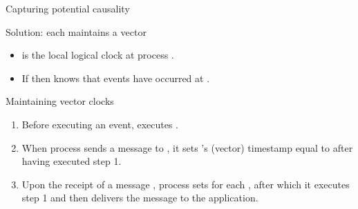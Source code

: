 \begin{slide}{Capturing potential causality}
  \begin{block}{Solution: each  maintains a vector }
    \begin{itemize}
    \item {} is the local logical clock at process .
    \item If  then  knows that  events have occurred at
      .
    \end{itemize}
  \end{block}
  \begin{block}{Maintaining vector clocks}
    \begin{enumerate}
    \item Before executing an event,  executes .
    \item When process  sends a message  to , it sets 's (vector) timestamp
       equal to  after having executed step 1.
    \item Upon the receipt of a message , process  sets  for each , after which it executes step 1 and then
      delivers the message to the application.
    \end{enumerate}
  \end{block}
\end{slide}
